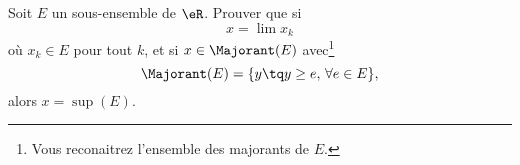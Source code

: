 
\begin{exercice}\label{exo0005}


Soit $E$ un sous-ensemble de $\eR$. Prouver que si
\[
	x = \lim x_k 
\]
où $x_k\in E$ pour tout $k$, et si $x\in \Majorant(E)$ avec\footnote{Vous reconaitrez l'ensemble des majorants de $E$.}
\begin{equation}
	\Majorant(E)=\{ y \tq y \geq e,\,\forall e\in E \},
\end{equation}
alors $x= \sup(E)$.

\end{exercice}
